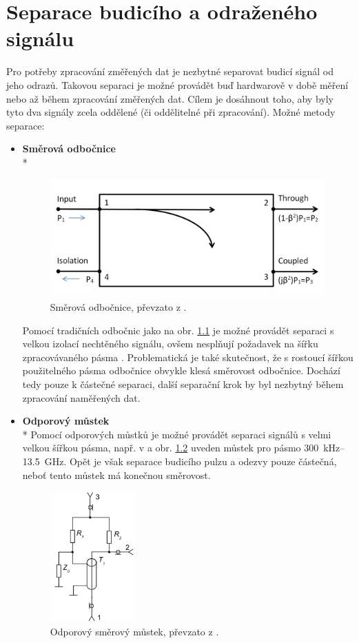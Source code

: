 \chapter{Separace budicího a odraženého signálu}
Pro potřeby zpracování změřených dat je nezbytné separovat budicí signál od jeho odrazů. Takovou separaci je možné provádět buď hardwarově v době měření nebo až během zpracování změřených dat. Cílem je dosáhnout toho, aby byly tyto dva signály zcela oddělené (či oddělitelné při zpracování). Možné metody separace:
\begin{itemize}
	\item
	\textbf{Směrová odbočnice}\\*	
	\begin{figure}[htbp]\includegraphics[width=.8\textwidth,keepaspectratio]{images/directionalcoupler.png}\caption{Směrová odbočnice, převzato z \cite{widebandcouplers}.}\label{directionalcoupler}\end{figure}	

	Pomocí tradičních odbočnic jako na obr. \ref{directionalcoupler} je možné provádět separaci s velkou izolací nechtěného signálu, ovšem nesplňují požadavek na šířku zpracovávaného pásma \cite{widebandcouplers}. Problematická je také skutečnost, že s rostoucí šířkou použitelného pásma odbočnice obvykle klesá směrovost odbočnice. Dochází tedy pouze k částečné separaci, další separační krok by byl nezbytný během zpracování naměřených dat.
	
	\item
	\textbf{Odporový můstek}\\*	
	Pomocí odporových můstků je možné provádět separaci signálů s velmi velkou šířkou pásma, např. v \cite{resistivedirectionalbridge} a obr. \ref{resistivebridge} uveden můstek pro pásmo \SI{300}{\kilo\hertz}--\SI{13.5}{\giga\hertz}. Opět je však separace budicího pulzu a odezvy pouze částečná, neboť tento můstek má konečnou směrovost.

	\begin{figure}[htbp]\includegraphics[width=\textwidth,height=5cm,keepaspectratio]{images/resistivebridge.png}\caption{Odporový směrový můstek, převzato z \cite{resistivedirectionalbridge}.}\label{resistivebridge}\end{figure}	
	

\end{itemize}
